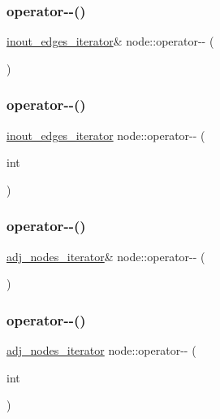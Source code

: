 \subsubsection{\texorpdfstring{operator-\/-\/()}{operator--()}\hspace{0.1cm}{\footnotesize\ttfamily [3/6]}}
{\footnotesize\ttfamily \mbox{\hyperlink{classnode_a854d596611e6a3342090cce71cedf300}{inout\+\_\+edges\+\_\+iterator}}\& node\+::operator-\/-\/ (\begin{DoxyParamCaption}{ }\end{DoxyParamCaption})}

\mbox{\label{classnode_a9b906907ed01bb04c06bed300428da11}} 
\subsubsection{\texorpdfstring{operator-\/-\/()}{operator--()}\hspace{0.1cm}{\footnotesize\ttfamily [4/6]}}
{\footnotesize\ttfamily \mbox{\hyperlink{classnode_a854d596611e6a3342090cce71cedf300}{inout\+\_\+edges\+\_\+iterator}} node\+::operator-\/-\/ (\begin{DoxyParamCaption}\item[{int}]{ }\end{DoxyParamCaption})}

\mbox{\label{classnode_abd4b60efd003b18db13d9fde0a25f91a}} 
\subsubsection{\texorpdfstring{operator-\/-\/()}{operator--()}\hspace{0.1cm}{\footnotesize\ttfamily [5/6]}}
{\footnotesize\ttfamily \mbox{\hyperlink{classnode_a392f19ea6dfa344bdf5c4d5a4b25eb8c}{adj\+\_\+nodes\+\_\+iterator}}\& node\+::operator-\/-\/ (\begin{DoxyParamCaption}{ }\end{DoxyParamCaption})}

\mbox{\label{classnode_ae7cdb2be553782c2dcf48c6ec8ef9d67}} 
\subsubsection{\texorpdfstring{operator-\/-\/()}{operator--()}\hspace{0.1cm}{\footnotesize\ttfamily [6/6]}}
{\footnotesize\ttfamily \mbox{\hyperlink{classnode_a392f19ea6dfa344bdf5c4d5a4b25eb8c}{adj\+\_\+nodes\+\_\+iterator}} node\+::operator-\/-\/ (\begin{DoxyParamCaption}\item[{int}]{ }\end{DoxyParamCaption})}

